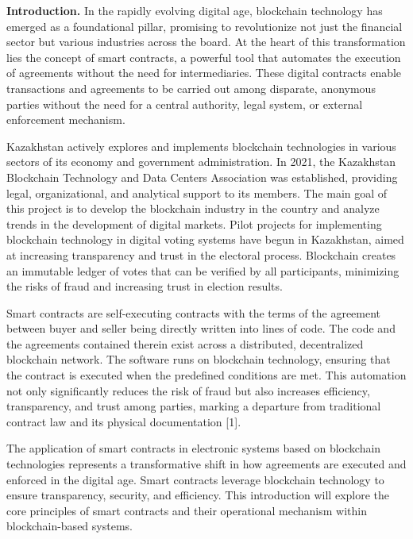 \begin{multicols}{2}
{\bfseries Introduction.} In the rapidly evolving digital age, blockchain
technology has emerged as a foundational pillar, promising to
revolutionize not just the financial sector but various industries
across the board. At the heart of this transformation lies the concept
of smart contracts, a powerful tool that automates the execution of
agreements without the need for intermediaries. These digital contracts
enable transactions and agreements to be carried out among disparate,
anonymous parties without the need for a central authority, legal
system, or external enforcement mechanism.

Kazakhstan actively explores and implements blockchain technologies in
various sectors of its economy and government administration. In 2021,
the Kazakhstan Blockchain Technology and Data Centers Association was
established, providing legal, organizational, and analytical support to
its members. The main goal of this project is to develop the blockchain
industry in the country and analyze trends in the development of digital
markets. Pilot projects for implementing blockchain technology in
digital voting systems have begun in Kazakhstan, aimed at increasing
transparency and trust in the electoral process. Blockchain creates an
immutable ledger of votes that can be verified by all participants,
minimizing the risks of fraud and increasing trust in election results.

Smart contracts are self-executing contracts with the terms of the
agreement between buyer and seller being directly written into lines of
code. The code and the agreements contained therein exist across a
distributed, decentralized blockchain network. The software runs on
blockchain technology, ensuring that the contract is executed when the
predefined conditions are met. This automation not only significantly
reduces the risk of fraud but also increases efficiency, transparency,
and trust among parties, marking a departure from traditional contract
law and its physical documentation {[}1{]}.

The application of smart contracts in electronic systems based on
blockchain technologies represents a transformative shift in how
agreements are executed and enforced in the digital age. Smart contracts
leverage blockchain technology to ensure transparency, security, and
efficiency. This introduction will explore the core principles of smart
contracts and their operational mechanism within blockchain-based
systems.


\end{multicols}
